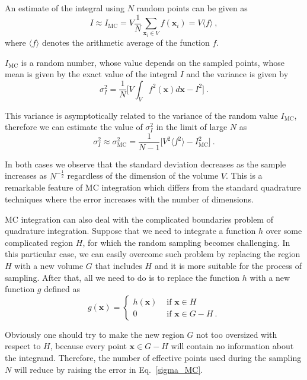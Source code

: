 \documentclass[../main/main.tex]{subfiles}
\begin{document}
An estimate of the integral using $N$ random points can be given as
\begin{equation}
	I \approx I_{\text{MC}} = V \frac{1}{N} \sum_{\textbf{x}_i \in V} f(\textbf{x}_i) = V \langle f \rangle \ ,
\end{equation}
where $\langle f \rangle$ denotes the arithmetic average of the function $f$.

$I_{\text{MC}}$ is a random number, whose value depends on the sampled points, whose mean 
is given by the exact value of the integral $I$ and the variance is given by
\begin{equation}
	\label{variance}
	\sigma^2_I = \frac{1}{N} \big[ V \int_{V}   f^2(\textbf{x}) d \textbf{x}  - I^2 \big] \ .
\end{equation}

This variance is asymptotically related to the variance of the random value $I_{\text{MC}}$, therefore
we can estimate the value of $\sigma^2_I$ in the limit of large $N$ as
\begin{equation}
	\label{sigma_MC}
	\sigma^2_I \approx \sigma^2_\text{MC}  = \frac{1}{N-1} \Big[ 
	V^2 \langle  f^2 \rangle 
	- I^2_{\text{MC}}\Big] \ .
\end{equation}

In both cases we observe that the standard deviation decreases as the sample increases 
as $N^{-\frac{1}{2}}$ regardless of the dimension of the volume $V$. This is a remarkable feature of MC integration which differs from the standard quadrature techniques where the error 
increases with the number of dimensions.

MC integration can also deal with the complicated boundaries problem of quadrature integration.
Suppose that we need to integrate a function $h$ over some complicated region $H$, for which the 
random sampling becomes challenging. 
In this particular case, we can easily overcome such problem by replacing the region $H$ with a new volume 
$G$ that includes $H$ and it is more suitable for the process of sampling. After that, all we need to do is to replace the function $h$ with a new function $g$ defined as
\begin{equation}
	g(\textbf{x}) = \begin{cases}
		h(\textbf{x}) &\text{ if $\textbf{x} \in H$} \\
		0 &\text{ if $\textbf{x} \in G - H$} \ .
	\end{cases}
\end{equation}

Obviously one should try to make the new region $G$ not too oversized with respect to $H$, because every 
point $\textbf{x} \in G - H$ will contain no information about the integrand. Therefore, the number of 
effective points used during the sampling $N$ will reduce by raising the error in Eq.~\ref{sigma_MC}.
\end{document}

